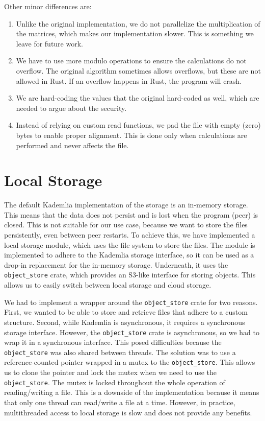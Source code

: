 Other minor differences are:
\begin{enumerate}
    \item Unlike the original implementation, we do not parallelize the multiplication of the matrices,
        which makes our implementation slower.
        This is something we leave for future work.
    \item We have to use more modulo operations to ensure the calculations do not overflow.
        The original algorithm sometimes allows overflows, but these are not allowed in Rust.
        If an overflow happens in Rust, the program will crash.
    \item We are hard-coding the values that the original hard-coded as well, which are needed to argue about the security.
    \item Instead of relying on custom read functions, we pad the file with empty (zero) bytes to enable proper alignment.
        This is done only when calculations are performed and never affects the file.
\end{enumerate}

\section{Local Storage}

The default Kademlia implementation of the storage is an in-memory storage.
This means that the data does not persist and is lost when the program (peer) is closed.
This is not suitable for our use case, because we want to store the files persistently, even between peer restarts.
To achieve this, we have implemented a local storage module, which uses the file system to store the files.
The module is implemented to adhere to the Kademlia storage interface, so it can be used as a drop-in replacement for the in-memory storage.
Underneath, it uses the \texttt{object\_store} crate, which provides an S3-like interface for storing objects.
This allows us to easily switch between local storage and cloud storage.

We had to implement a wrapper around the \texttt{object\_store} crate for two reasons.
First, we wanted to be able to store and retrieve files that adhere to a custom structure.
Second, while Kademlia is asynchronous, it requires a synchronous storage interface.
However, the \texttt{object\_store} crate is asynchronous, so we had to wrap it in a synchronous interface.
This posed difficulties because the \texttt{object\_store} was also shared between threads.
The solution was to use a reference-counted pointer wrapped in a mutex to the \texttt{object\_store}.
This allows us to clone the pointer and lock the mutex when we need to use the \texttt{object\_store}.
The mutex is locked throughout the whole operation of reading/writing a file.
This is a downside of the implementation because it means that only one thread can read/write a file at a time.
However, in practice, multithreaded access to local storage is slow and does not provide any benefits.


